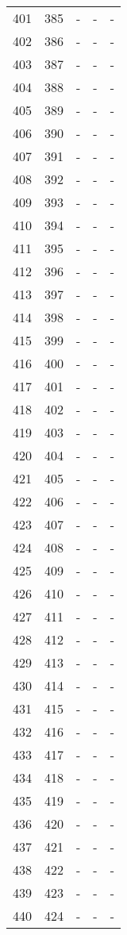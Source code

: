 \documentclass[10pt]{article}
\begin{document}
\begin {longtable}{l r r r r}
401 & 385 & - & - & - \\
402 & 386 & - & - & - \\
403 & 387 & - & - & - \\
404 & 388 & - & - & - \\
405 & 389 & - & - & - \\
406 & 390 & - & - & - \\
407 & 391 & - & - & - \\
408 & 392 & - & - & - \\
409 & 393 & - & - & - \\
410 & 394 & - & - & - \\
411 & 395 & - & - & - \\
412 & 396 & - & - & - \\
413 & 397 & - & - & - \\
414 & 398 & - & - & - \\
415 & 399 & - & - & - \\
416 & 400 & - & - & - \\
417 & 401 & - & - & - \\
418 & 402 & - & - & - \\
419 & 403 & - & - & - \\
420 & 404 & - & - & - \\
421 & 405 & - & - & - \\
422 & 406 & - & - & - \\
423 & 407 & - & - & - \\
424 & 408 & - & - & - \\
425 & 409 & - & - & - \\
426 & 410 & - & - & - \\
427 & 411 & - & - & - \\
428 & 412 & - & - & - \\
429 & 413 & - & - & - \\
430 & 414 & - & - & - \\
431 & 415 & - & - & - \\
432 & 416 & - & - & - \\
433 & 417 & - & - & - \\
434 & 418 & - & - & - \\
435 & 419 & - & - & - \\
436 & 420 & - & - & - \\
437 & 421 & - & - & - \\
438 & 422 & - & - & - \\
439 & 423 & - & - & - \\
440 & 424 & - & - & - \\

\end{longtable}
\end{document}
